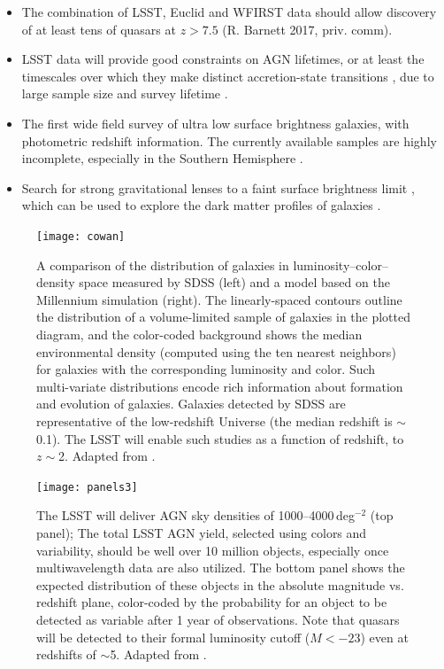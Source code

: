 \begin{itemize}
\item The combination of LSST, Euclid and WFIRST data should allow discovery of at least
       tens of quasars at $z>7.5$ (R. Barnett 2017, priv. comm).
\item LSST data will provide good constraints on AGN lifetimes, or at least the timescales over which
         they make distinct accretion-state transitions \citep{2016MNRAS.457..389M}, due to large sample
         size and survey lifetime \citep[e.g.][]{2003ApJ...597L.109M}.
\item The first wide field survey of ultra low surface brightness galaxies, with
      photometric redshift information. The currently available
      samples \citep[e.g.][]{2018ApJ...857..104G} are highly
      incomplete, especially in the Southern Hemisphere \citep[see Fig.~7 in][]{2007ApJ...654..897B}.
\item Search for strong gravitational lenses to a faint surface
  brightness limit \citep[e.g.][]{1998A&A...330....1B,1998ApJ...498L.107T,2007ApJ...671L...9B}, which can be used to
  explore the dark matter profiles of galaxies \citep[e.g.,][]{2006ApJ...640..662T}.
\end{itemize}


\begin{figure}
\texttt{[image: cowan]}
\caption{A comparison of the distribution of galaxies in
luminosity--color--density space measured by SDSS (left) and a model based
on the Millennium simulation (right). The linearly-spaced contours outline
the distribution of a volume-limited sample of galaxies in the plotted diagram, and
the color-coded background shows the median environmental density (computed
using the ten nearest neighbors) for galaxies
with the corresponding luminosity and color. Such multi-variate distributions
encode rich information about formation and evolution of galaxies. Galaxies
detected by SDSS are representative of the low-redshift Universe (the median
redshift is $\sim$0.1). The LSST will enable such studies as a function of
redshift, to $z\sim$2. Adapted from \citet{2008ApJ...674L..13C}.}
\label{Fig:cowan}
\end{figure}


\begin{figure}
\texttt{[image: panels3]}
\caption{The LSST will deliver AGN sky densities of 1000--4000\,deg$^{-2}$ (top panel);
The total LSST AGN yield, selected using colors and variability, should be well over
10 million objects, especially once multiwavelength data are also utilized.
The bottom panel shows the expected distribution of these objects in the
absolute magnitude vs. redshift plane, color-coded by the probability for
an object to be
detected as variable after 1 year of observations. Note that quasars will
be detected to their formal luminosity cutoff ($M< -23$) even at redshifts
of $\sim$5. Adapted from \citet{2007AAS...21113709B}.}
\label{Fig:panels3}
\end{figure}

